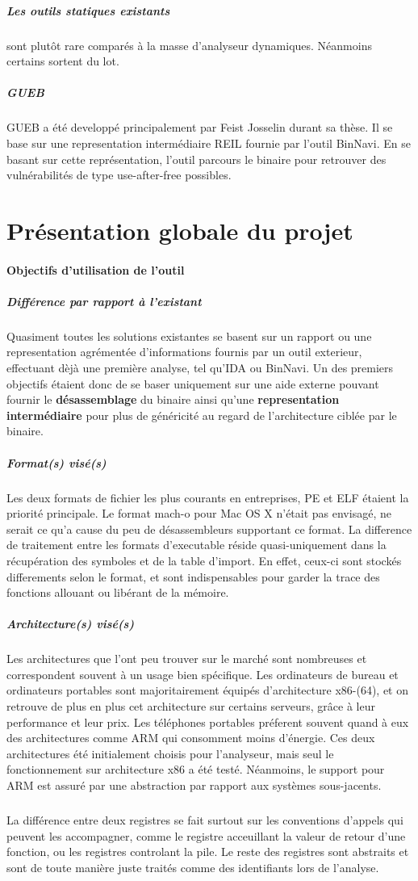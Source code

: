 \subparagraph{Les outils statiques existants} sont plutôt rare comparés à la masse d'analyseur dynamiques. Néanmoins certains sortent du lot.

\subparagraph{GUEB}
GUEB a été developpé principalement par Feist Josselin durant sa thèse. Il se base sur une representation intermédiaire
REIL fournie par l'outil BinNavi. En se basant sur cette représentation, l'outil parcours le binaire pour retrouver des vulnérabilités
de type use-after-free possibles.

\section{Présentation globale du projet}

\paragraph{Objectifs d'utilisation de l'outil}

\subparagraph{Différence par rapport à l'existant}

Quasiment toutes les solutions existantes se basent sur un rapport ou une representation agrémentée d'informations fournis
par un outil exterieur, effectuant dèjà une première analyse, tel qu'IDA ou BinNavi. Un des premiers objectifs étaient donc de
se baser uniquement sur une aide externe pouvant fournir le \textbf{désassemblage} du binaire ainsi qu'une \textbf{representation intermédiaire}
pour plus de généricité au regard de l'architecture ciblée par le binaire.

\subparagraph{Format(s) visé(s)}

Les deux formats de fichier les plus courants en entreprises, PE et ELF étaient la priorité principale. Le format mach-o pour
Mac OS X n'était pas envisagé, ne serait ce qu'a cause du peu de désassembleurs supportant ce format. La difference de traitement
entre les formats d'executable réside quasi-uniquement dans la récupération des symboles et de la table d'import. En effet, ceux-ci
sont stockés differements selon le format, et sont indispensables pour garder la trace des fonctions allouant ou libérant de la mémoire.

\subparagraph{Architecture(s) visé(s)}
Les architectures que l'ont peu trouver sur le marché sont nombreuses et correspondent souvent à un usage bien spécifique.
Les ordinateurs de bureau et ordinateurs portables sont majoritairement équipés d'architecture x86-(64), et on retrouve de plus en plus
cet architecture sur certains serveurs, grâce à leur performance et leur prix. Les téléphones portables préferent souvent quand à eux
des architectures comme ARM qui consomment moins d'énergie. Ces deux architectures été initialement choisis pour l'analyseur, mais seul
le fonctionnement sur architecture x86 a été testé. Néanmoins, le support pour ARM est assuré par une abstraction par rapport aux systèmes
sous-jacents.
\subparagraph{}
La différence entre deux registres se fait surtout sur les conventions d'appels qui peuvent les accompagner, comme le registre acceuillant
la valeur de retour d'une fonction, ou les registres controlant la pile. Le reste des registres sont abstraits et sont de toute manière
juste traités comme des identifiants lors de l'analyse.


